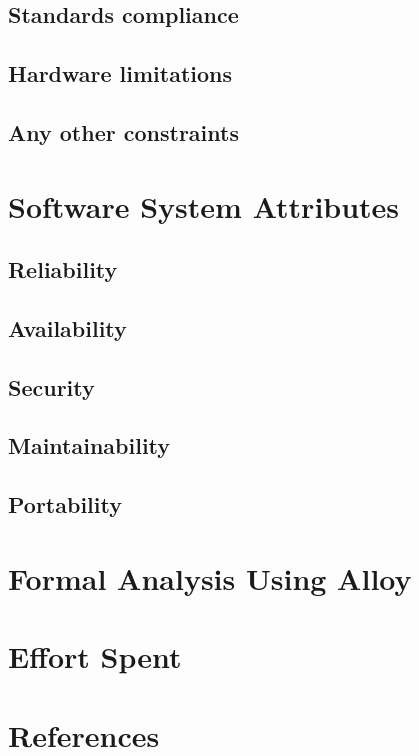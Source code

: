 \subsection{Standards compliance}

\subsection{Hardware limitations}

\subsection{Any other constraints}

\section{Software System Attributes}

\subsection{Reliability}

\subsection{Availability}

\subsection{Security}

\subsection{Maintainability}

\subsection{Portability}

\section{Formal Analysis Using Alloy}

\section{Effort Spent}

\section{References}